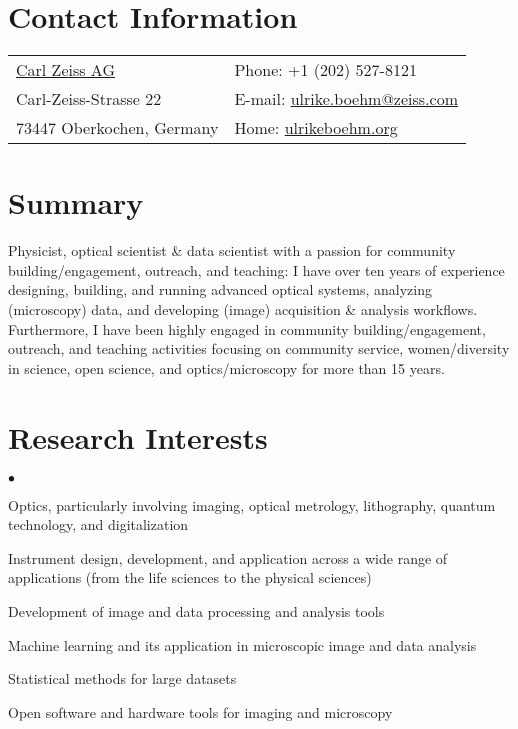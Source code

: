 \documentclass[margin,line]{res}
\newenvironment{list2}{
  \begin{list}{$\bullet$}{%
      \setlength{\itemsep}{0in}
      \setlength{\parsep}{0in} \setlength{\parskip}{0in}
      \setlength{\topsep}{0in} \setlength{\partopsep}{0in} 
      \setlength{\leftmargin}{0.2in}}}{\end{list}}
\begin{document}


\begin{resume}


\section{\sc Contact Information}
\vspace{.05in}
\begin{tabular}{@{}p{3.5in}p{4in}}
 \href{https://www.zeiss.de/}{Carl Zeiss AG}     & {Phone:} +1 (202) 527-8121 \\            
 Carl-Zeiss-Strasse 22   & { E-mail:}   \href{mailto:ulrike.boehm@zeiss.com}{ulrike.boehm@zeiss.com}  \\         
73447 Oberkochen, Germany & { Home:}  \href{http://ulrikeboehm.org/}{ulrikeboehm.org}\\           
\end{tabular}


\section{\sc Summary}
Physicist, optical scientist \& data scientist with a passion for community building/engagement, outreach, and teaching: I have over ten years of experience designing, building, and running advanced optical systems, analyzing (microscopy) data, and developing (image) acquisition \& analysis workflows. Furthermore, I have been highly engaged in community building/engagement, outreach, and teaching activities focusing on community service, women/diversity in science, open science, and optics/microscopy for more than 15 years.


\section{\sc Research Interests}
\begin{list2}
\item Optics, particularly involving imaging, optical metrology, lithography, quantum technology, and digitalization
\item Instrument design, development, and application across a wide range of applications  (from the life sciences to the physical sciences)
\item Development of image and data processing and analysis tools
\item Machine learning and its application in microscopic image and data analysis
\item Statistical methods for large datasets
\item Open software and hardware tools for imaging and microscopy
\end{list2}


\end{resume}
\end{document}
